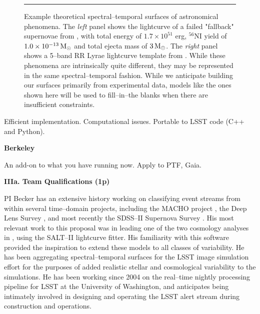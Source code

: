 \begin{figure}[t]
\centerline{ \hfil
{}} \smallskip
\caption[]{\footnotesize Example theoretical spectral--temporal surfaces of
astronomical phenomena.  The {\it left} panel shows the lightcurve of a failed
"fallback" supernovae from \cite{2009ApJ...707..193F}, with total energy of $1.7
\times 10^{51}$ erg, $^{56}$NI yield of $1.0 \times 10^{-13} {\rm\,M_\odot}$ and total
ejecta mass of $3 {\rm\,M_\odot}$.  The {\it right} panel shows a 5--band RR Lyrae
lightcurve template from \cite{2010ApJ...708..717S}.  While these phenomena are
intrinsically quite different, they may be represented in the same
spectral--temporal fashion.  While we anticipate building our surfaces primarily
from experimental data, models like the ones shown here will be used to
fill--in--the blanks when there are insufficient constraints.} \medskip \hrule
\label{fig:salt2} \end{figure}


 

Efficient implementation.  Computational issues.  Portable to LSST code (C++ and
Python).

 \smallskip
{\bf Berkeley}

An add-on to what you have running now.  Apply to PTF, Gaia.



\bigskip \centerline{\bf IIIa. Team Qualifications (1p)} \smallskip

 \smallskip

PI Becker has an extensive history working on classifying event streams from
within several time--domain projects, including the MACHO project
\citep{2000PhDT.......258B}, the Deep Lens Survey \citep{2004ApJ...611..418B},
and most recently the SDSS--II Supernova Survey
\citep{2008AJ....135..338F,2008AJ....135..348S}.  His most relevant work to this
proposal was in leading one of the two cosmology analyses in
\cite{2009ApJS..185...32K}, using the SALT--II lightcurve fitter.  His
familiarity with this software provided the inspiration to extend these models
to all classes of variability. He has been aggregating spectral--temporal
surfaces for the LSST image simulation effort \citep{2010SPIE.7738E..53C} for
the purposes of added realistic stellar and cosmological variability to the
simulations.  He has been working since 2004 on the real--time nightly
processing pipeline for LSST at the University of Washington, and anticipates
being intimately involved in designing and operating the LSST alert stream
during construction and operations.

